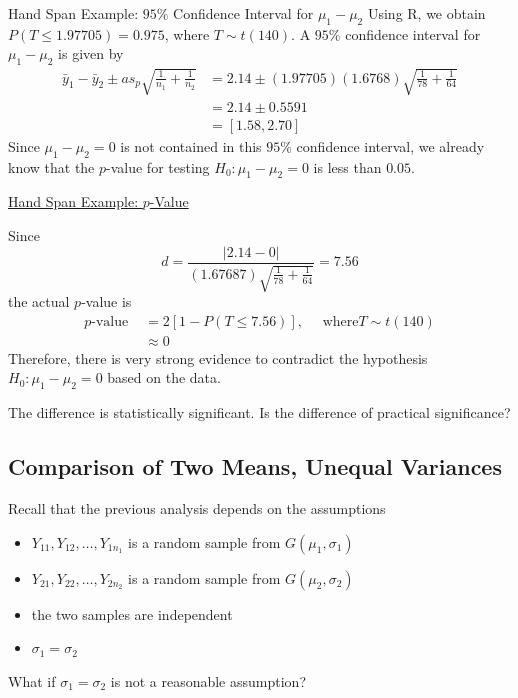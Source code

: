 \documentclass[oneside]{book}
\begin{document}
\begin{Example}{Hand Span Example: $ 95\% $ Confidence Interval for $ \mu_1-\mu_2 $}{}
    Using R, we obtain $ P(T\leq 1.97705)=0.975 $, where $ T\sim t(140) $.
    A $ 95\% $ confidence interval for $ \mu_1-\mu_2 $ is given by
    \[\begin{aligned}
            \bar{y}_{1}-\bar{y}_{2} \pm a s_{p} \sqrt{\frac{1}{n_{1}}+\frac{1}{n_{2}}} & =2.14 \pm(1.97705)(1.6768) \sqrt{\frac{1}{78}+\frac{1}{64}} \\
                                                                                       & =2.14 \pm 0.5591                                            \\
                                                                                       & =[1.58,2.70]
        \end{aligned}\]
    Since $ \mu_1-\mu_2=0 $ is not contained in this $ 95\% $ confidence interval, we already
    know that the $ p $-value for testing $ H_0:\mu_1-\mu_2=0 $ is less than $ 0.05 $.

    \underline{Hand Span Example: $ p $-Value}

    Since
    \[d=\frac{|2.14-0|}{(1.67687) \sqrt{\frac{1}{78}+\frac{1}{64}}}=7.56\]
    the actual $ p $-value is
    \[\begin{aligned}
            p \text{-value } & =2[1-P(T \leq 7.56)], \quad \text{ where} T \sim t(140) \\
                             & \approx 0
        \end{aligned}\]
    Therefore, there is very strong evidence to contradict the hypothesis $ H_0:\mu_1-\mu_2=0 $
    based on the data.

    The difference is statistically significant. Is the difference of practical significance?
\end{Example}


\subsection{Comparison of Two Means, Unequal Variances}
Recall that the previous analysis depends on the assumptions
\begin{itemize}
    \item $ Y_{11},Y_{12},\ldots ,Y_{1n_1} $ is a random sample from $ G(\mu_1,\sigma_1) $
    \item $ Y_{21},Y_{22},\ldots ,Y_{2n_2} $ is a random sample from $ G(\mu_2,\sigma_2) $
    \item the two samples are independent
    \item $ \sigma_1=\sigma_2 $
\end{itemize}
What if $ \sigma_1=\sigma_2 $ is not a reasonable assumption?
\end{document}
